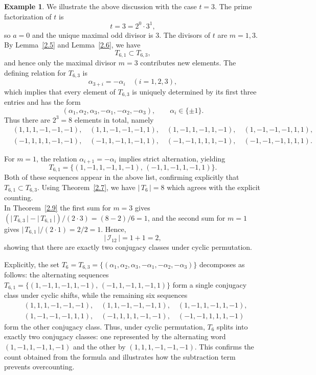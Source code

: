 \documentclass[a4paper,12pt]{amsart}
\numberwithin{equation}{section}
\theoremstyle{definition}
\newtheorem{example}[theorem]{Example}
\newcommand{\thmref}[1]{Theorem~\ref{#1}}
\newcommand{\lemref}[1]{Lemma~\ref{#1}}
\numberwithin{equation}{section}
\begin{document}
\begin{example} 
We illustrate the above discussion with the case $t=3$. The prime factorization of $t$ is 
$$
t=3=2^{0}\cdot 3^{1},
$$
so $a=0$ and the unique maximal odd divisor is $3$. The divisors of $t$ are $m=1,3$.  
By \lemref{2.5} and \lemref{2.6}, we have 
$$
T_{6,1}\subset T_{6,3},
$$
and hence only the maximal divisor $m=3$ contributes new elements.
The defining relation for $T_{6,3}$ is
$$
\alpha_{3+i}=-\alpha_i \quad (i=1,2,3),
$$
which implies that every element of $T_{6,3}$ is uniquely determined by its first three entries and has the form
$$
(\alpha_1,\alpha_2,\alpha_3,-\alpha_1,-\alpha_2,-\alpha_3), \qquad \alpha_i \in \{\pm1\}.
$$
Thus there are $2^3 = 8$ elements in total, namely
$$
\begin{aligned}
&(1,1,1,-1,-1,-1), \quad (1,1,-1,-1,-1,1), \quad (1,-1,1,-1,1,-1), \quad (1,-1,-1,-1,1,1),\\
&(-1,1,1,1,-1,-1), \quad (-1,1,-1,1,-1,1), \quad (-1,-1,1,1,1,-1), \quad (-1,-1,-1,1,1,1).
\end{aligned}
$$

For $m=1$, the relation $\alpha_{i+1}=-\alpha_i$ implies strict alternation, yielding
$$
T_{6,1}=\{(1,-1,1,-1,1,-1), \, (-1,1,-1,1,-1,1)\}.
$$
Both of these sequences appear in the above list, confirming explicitly that $T_{6,1}\subset T_{6,3}$.  
Using \thmref{2.7}, we have $\lvert\,T_6\,\rvert=8$ which agrees with the explicit counting.  
\\
In \thmref{2.9} the first sum for $m=3$ gives $(\lvert\,T_{6,3}\,\rvert-\lvert\,T_{6,1}\,\rvert)/(2\cdot 3) = (8-2)/6 = 1$, and the second sum for $m=1$ gives $\lvert\,T_{6,1}\,\rvert/(2\cdot 1) = 2/2 = 1$.  
Hence, 
$$
\lvert\,\mathscr{I}_{12}\,\rvert = 1 + 1 = 2,
$$
showing that there are exactly two conjugacy classes under cyclic permutation.

Explicitly, the set $T_6 = T_{6,3} = \{ (\alpha_1,\alpha_2,\alpha_3,-\alpha_1,-\alpha_2,-\alpha_3) \}$ decomposes as follows: the alternating sequences $T_{6,1} = \{(1,-1,1,-1,1,-1), \, (-1,1,-1,1,-1,1)\}$ form a single conjugacy class under cyclic shifts, while the remaining six sequences
$$ \begin{aligned}
&(1,1,1,-1,-1,-1), \quad (1,1,-1,-1,-1,1), \quad (1,-1,1,-1,1,-1), \\
& (1,-1,-1,-1,1,1), \quad (-1,1,1,1,-1,-1), \quad (-1,-1,1,1,1,-1)
\end{aligned}
$$
form the other conjugacy class. Thus, under cyclic permutation, $T_6$ splits into exactly two conjugacy classes: one represented by the alternating word $(1,-1,1,-1,1,-1)$ and the other by $(1,1,1,-1,-1,-1)$. This confirms the count obtained from the formula and illustrates how the subtraction term prevents overcounting.
\end{example}
\end{document}
